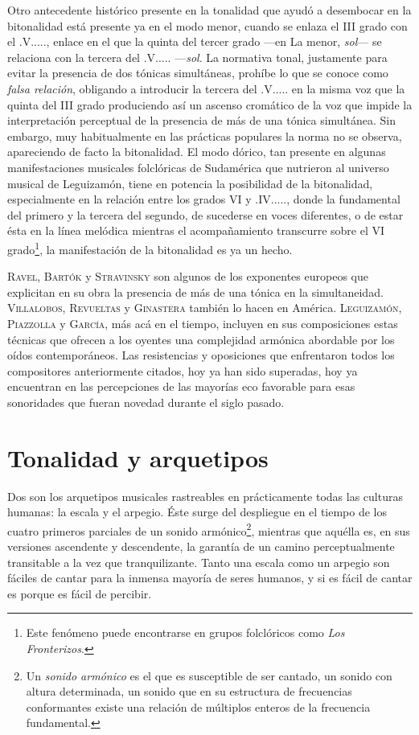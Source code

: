 Otro antecedente histórico presente en la tonalidad que ayudó a desembocar en la bitonalidad está presente ya en el modo menor, cuando se enlaza el III grado con el \acorde.V....., enlace en el que la quinta del tercer grado ---en La menor, \emph{sol}--- se relaciona con la tercera del \acorde.V..... ---\emph{sol\sostenidotxt}. La normativa tonal, justamente para evitar la presencia de dos tónicas simultáneas, prohíbe lo que se conoce como \emph{falsa relación}, obligando a introducir la tercera del \acorde.V..... en la misma voz que la quinta del III grado produciendo así un ascenso cromático de la voz que impide la interpretación perceptual de la presencia de más de una tónica simultánea. Sin embargo, muy habitualmente en las prácticas populares la norma no se observa, apareciendo de facto la bitonalidad. El modo dórico, tan presente en algunas manifestaciones musicales folclóricas de Sudamérica que nutrieron al universo musical de Leguizamón, tiene en potencia la posibilidad de la bitonalidad, especialmente en la relación entre los grados VI y \acorde.IV....., donde la fundamental del primero y la tercera del segundo, de sucederse en voces diferentes, o de estar ésta en la línea melódica mientras el acompañamiento transcurre sobre el VI grado\footnote{Este fenómeno puede encontrarse en grupos folclóricos como \emph{Los Fronterizos}.}, la manifestación de la bitonalidad es ya un hecho.

\textsc{Ravel}, \textsc{Bartók} y \textsc{Stravinsky} son algunos de los exponentes europeos que explicitan en su obra la presencia de más de una tónica en la simultaneidad. \textsc{Villalobos}, \textsc{Revueltas} y \textsc{Ginastera} también lo hacen en América. \textsc{Leguizamón}, \textsc{Piazzolla} y \textsc{García}, más acá en el tiempo, incluyen en sus composiciones estas técnicas que ofrecen a los oyentes una complejidad armónica abordable por los oídos contemporáneos. Las resistencias y oposiciones que enfrentaron todos los compositores anteriormente citados, hoy ya han sido superadas, hoy ya encuentran en las percepciones de las mayorías eco favorable para esas sonoridades que fueran novedad durante el siglo pasado.

\section{Tonalidad y arquetipos}
\label{sec:tonalidad-arquetipos}

Dos son los arquetipos musicales rastreables en prácticamente todas las culturas humanas: la escala y el arpegio. Éste surge del despliegue en el tiempo de los cuatro primeros parciales de un sonido armónico\footnote{Un \emph{sonido armónico} es el que es susceptible de ser cantado, un sonido con altura determinada, un sonido que en su estructura de frecuencias conformantes existe una relación de múltiplos enteros de la frecuencia fundamental.}, mientras que aquélla es, en sus versiones ascendente y descendente, la garantía de un camino perceptualmente transitable a la vez que tranquilizante. Tanto una escala como un arpegio son fáciles de cantar para la inmensa mayoría de seres humanos, y si es fácil de cantar es porque es fácil de percibir.

